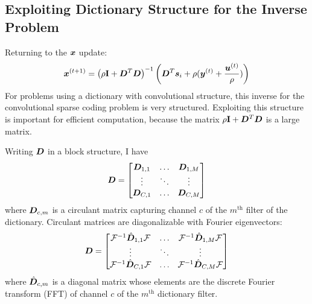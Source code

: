 \subsection{Exploiting Dictionary Structure for the Inverse Problem}
\label{subsection:SC xupdate}
Returning to the $\bm{x}$ update:
\begin{equation}
\bm{x}^{(t + 1)} = \left(\rho{\bf I} + \bm{D}^T\bm{D}\right)^{-1}\left(\bm{D}^T\bm{s}_i + \rho(\bm{y}^{(t)} + \frac{\bm{u}^{(t)}}{\rho})\right)
\end{equation}
%
For problems using a dictionary with convolutional structure, this inverse for the convolutional sparse coding problem is very structured. Exploiting this structure is important for efficient computation, because the matrix $\rho{\bf I} + \bm{D}^T\bm{D}$ is a large matrix.

Writing $\bm{D}$ in a block structure, I have
%
\begin{equation}
\bm{D} = \begin{bmatrix}
\bm{D}_{1,1} & \hdots & \bm{D}_{1,M}\\
\vdots & \ddots & \vdots\\
\bm{D}_{C,1} & \hdots & \bm{D}_{C,M}
\end{bmatrix}
\end{equation}
%
where $\bm{D}_{c,m}$ is a circulant matrix capturing channel $c$ of the $m^{\text{th}}$ filter of the dictionary. Circulant matrices are diagonalizable with Fourier eigenvectors:
%
\begin{equation}
\bm{D} = \begin{bmatrix}
\mathcal{F}^{-1}\hat{\bm{D}}_{1,1}\mathcal{F} & \hdots & \mathcal{F}^{-1}\hat{\bm{D}}_{1,M}\mathcal{F}\\
\vdots & \ddots & \vdots\\
\mathcal{F}^{-1}\hat{\bm{D}}_{C,1}\mathcal{F} & \hdots & \mathcal{F}^{-1}\hat{\bm{D}}_{C,M}\mathcal{F}
\end{bmatrix}
\end{equation}
%
where $\hat{\bm{D}}_{c,m}$ is a diagonal matrix whose elements are the discrete Fourier transform (FFT) of channel $c$ of the $m^{\text{th}}$ dictionary filter.

